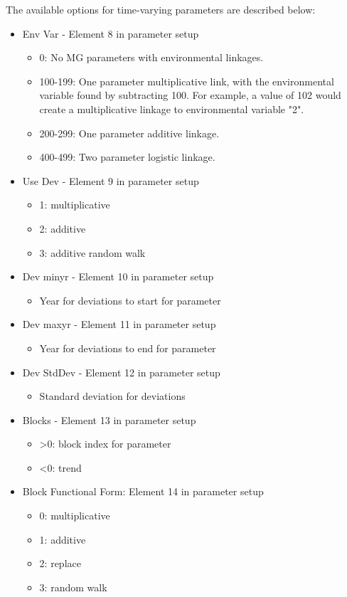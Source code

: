 The available options for time-varying parameters are described below:
\begin{itemize}
	\item Env Var - Element 8 in parameter setup
		\begin{itemize}
			\item 0: No MG parameters with environmental linkages.
			\item 100-199: One parameter multiplicative link, with the environmental variable found by subtracting 100.  For example, a value of 102 would create a multiplicative linkage to environmental variable "2".
			\item 200-299: One parameter additive linkage.
			\item 400-499: Two parameter logistic linkage.
		\end{itemize}
	\item Use Dev - Element 9 in parameter setup
	\begin{itemize}
		\item 1: multiplicative
		\item 2: additive
		\item 3: additive random walk
	\end{itemize}
	\item Dev minyr - Element 10 in parameter setup
	\begin{itemize}
		\item Year for deviations to start for parameter
	\end{itemize}
	\item Dev maxyr - Element 11 in parameter setup
		\begin{itemize}
			\item Year for deviations to end for parameter
		\end{itemize}
	\item Dev StdDev - Element 12 in parameter setup
		\begin{itemize}
			\item Standard deviation for deviations
		\end{itemize}
	\item Blocks - Element 13 in parameter setup
		\begin{itemize}
			\item >0: block index for parameter
			\item <0: trend
		\end{itemize}
	\item Block Functional Form: Element 14 in parameter setup
		\begin{itemize}
			\item 0: multiplicative
			\item 1: additive
			\item 2: replace
			\item 3: random walk
		\end{itemize}
\end{itemize}
